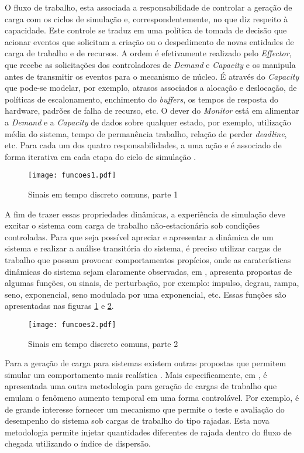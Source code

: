 O fluxo de trabalho, esta associada a responsabilidade de controlar a geração de carga com os ciclos de simulação e, correspondentemente, no que diz respeito à capacidade. Este controle se traduz em uma política de tomada de decisão que acionar eventos que solicitam a criação ou o despedimento de novas entidades de carga de trabalho e de recursos. A ordem é efetivamente realizado pelo \textit{Effector}, que recebe as solicitações dos controladores de \textit{Demand} e \textit{Capacity} e os manipula antes de transmitir os eventos para o mecanismo de núcleo. É através do \textit{Capacity} que pode-se modelar, por exemplo, atrasos associados a alocação e deslocação, de políticas de escalonamento, enchimento do \textit{buffers}, os tempos de resposta do hardware, padrões de falha de recurso, etc. O dever do \textit{Monitor} está em alimentar a \textit{Demand} e a \textit{Capacity} de dados sobre qualquer estado, por exemplo, utilização média do sistema, tempo de permanência trabalho, relação de perder \textit{deadline}, etc. Para cada um dos quatro responsabilidades, a uma ação e é associado de forma iterativa em cada etapa do ciclo de simulação \cite{Lourenco2015}. 

\begin{figure}[!htb]
	\caption{Sinais em tempo discreto comuns, parte 1}
	\label{fig:funcoes1}
	\centering
	\texttt{[image: funcoes1.pdf]}
\end{figure}

A fim de trazer essas propriedades dinâmicas, a experiência de simulação deve excitar o sistema com carga de trabalho não-estacionária sob condições controladas. Para que seja possível apreciar e apresentar a dinâmica de um sistema e realizar a análise transitória do sistema, é preciso utilizar cargas de trabalho que possam provocar comportamentos propícios, onde as caraterísticas dinâmicas do sistema sejam claramente observadas, em \cite{Hellerstein2004}, apresenta propostas de algumas funções, ou sinais, de perturbação, por exemplo: impulso, degrau, rampa, seno, exponencial, seno modulada por uma exponencial, etc.  Essas funções são apresentadas nas figuras \ref{fig:funcoes1} e \ref{fig:funcoes2}.

\begin{figure}[!htb]
	\caption{Sinais em tempo discreto comuns, parte 2}
	\label{fig:funcoes2}
	\centering
	\texttt{[image: funcoes2.pdf]}
\end{figure}

Para a geração de carga para sistemas existem outras propostas que permitem simular um comportamento mais realística \cite{Mi2010, Mi2009,Mi2008}. Mais especificamente, em \cite{Menasce2002}, é apresentada uma outra metodologia para geração de cargas de trabalho que emulam o fenômeno aumento temporal em uma forma controlável. Por exemplo, é de grande interesse fornecer um mecanismo que permite o teste e avaliação do desempenho do sistema sob cargas de trabalho do tipo rajadas. Esta nova metodologia permite injetar quantidades diferentes de rajada dentro do fluxo de chegada utilizando o índice de dispersão. 


